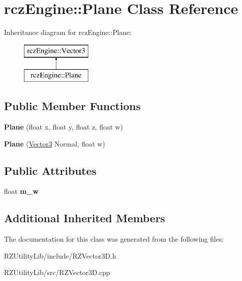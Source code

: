 \hypertarget{classrcz_engine_1_1_plane}{}\section{rcz\+Engine\+:\+:Plane Class Reference}
\label{classrcz_engine_1_1_plane}
Inheritance diagram for rcz\+Engine\+:\+:Plane\+:\begin{figure}[H]
\begin{center}
\leavevmode
\includegraphics[height=2.000000cm]{classrcz_engine_1_1_plane}
\end{center}
\end{figure}
\subsection*{Public Member Functions}
\begin{DoxyCompactItemize}
\item 
\hypertarget{classrcz_engine_1_1_plane_a20ab9069a24390feb01bbfeb98366594}{}{\bfseries Plane} (float x, float y, float z, float w)\label{classrcz_engine_1_1_plane_a20ab9069a24390feb01bbfeb98366594}

\item 
\hypertarget{classrcz_engine_1_1_plane_a1e548ea00a01ddd2fc2126ec6b81b7ef}{}{\bfseries Plane} (\hyperlink{classrcz_engine_1_1_vector3}{Vector3} Normal, float w)\label{classrcz_engine_1_1_plane_a1e548ea00a01ddd2fc2126ec6b81b7ef}

\end{DoxyCompactItemize}
\subsection*{Public Attributes}
\begin{DoxyCompactItemize}
\item 
\hypertarget{classrcz_engine_1_1_plane_a4ba4ee8b9ef4a318f4f6964909403ff7}{}float {\bfseries m\+\_\+w}\label{classrcz_engine_1_1_plane_a4ba4ee8b9ef4a318f4f6964909403ff7}

\end{DoxyCompactItemize}
\subsection*{Additional Inherited Members}


The documentation for this class was generated from the following files\+:\begin{DoxyCompactItemize}
\item 
R\+Z\+Utility\+Lib/include/R\+Z\+Vector3\+D.\+h\item 
R\+Z\+Utility\+Lib/src/R\+Z\+Vector3\+D.\+cpp\end{DoxyCompactItemize}
